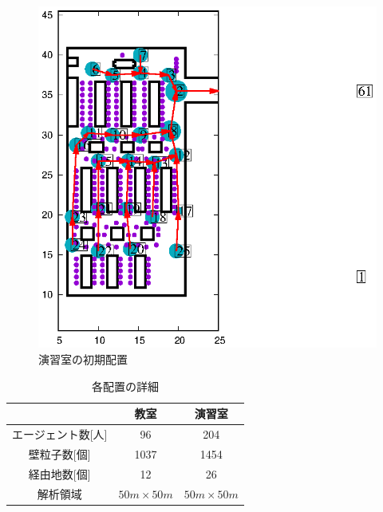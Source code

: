 \begin{figure}[tb]
\begin{minipage}[b]{0.5\columnwidth}
		\includegraphics[width=\columnwidth]{figure/pc_m.eps}
		\caption{演習室の初期配置}
    \label{fig:pc_haichi}
	\end{minipage}
\end{figure}
\begin{table}[tb]
  \begin{center}
    \caption{各配置の詳細}
    \label{tb:haichi_para}
    \begin{tabular}{c|c|c}
      \hline \hline
      & 教室 & 演習室 \\ \hline 
      エージェント数[人] & 96 & 204 \\ \hline
      壁粒子数[個] & 1037 & 1454\\ \hline
      経由地数[個] & 12   & 26 \\ \hline
      解析領域 & $50m\times50m$ & $50m\times50m$ \\ \hline
    \end{tabular}
  \end{center}
\end{table}
